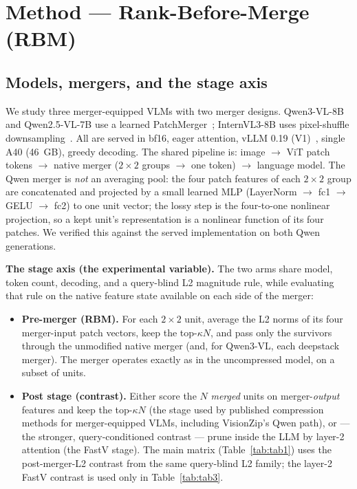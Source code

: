 \documentclass[sigconf,nonacm]{acmart}
\begin{document}
\section{Method --- Rank-Before-Merge (RBM)}\label{sec:method}

\subsection{Models, mergers, and the stage axis}\label{sec:models}

We study three merger-equipped VLMs with two merger designs. Qwen3-VL-8B
and Qwen2.5-VL-7B use a learned PatchMerger~\cite{bai2025qwen3vl,bai2025qwen25vl};
InternVL3-8B uses pixel-shuffle downsampling~\cite{zhu2025internvl3}.
All are served in bf16, eager
attention, vLLM 0.19 (V1)~\cite{kwon2023vllm}, single A40 (46~GB), greedy
decoding. The shared
pipeline is: image $\to$ ViT patch tokens $\to$ native merger ($2\!\times\!2$
groups $\to$ one token) $\to$ language model. The Qwen merger is \emph{not} an
averaging pool: the four patch features of each $2\!\times\!2$ group are
concatenated and projected by a small learned MLP (LayerNorm $\to$ fc1 $\to$
GELU $\to$ fc2) to one unit vector; the lossy step is the four-to-one nonlinear
projection, so a kept unit's representation is a nonlinear function of its four
patches. We verified this against the served implementation on both Qwen
generations.

\textbf{The stage axis (the experimental variable).} The two arms share model,
token count, decoding, and a query-blind L2 magnitude rule, while evaluating
that rule on the native feature state available on each side of the merger:
\begin{itemize}
  \item \textbf{Pre-merger (RBM).} For each $2\!\times\!2$ unit, average the
    L2 norms of its four merger-input patch vectors, keep the top-$\kappa N$,
    and pass only the
    survivors through the unmodified native merger (and, for Qwen3-VL, each
    deepstack merger). The merger operates exactly as in the uncompressed model,
    on a subset of units.
  \item \textbf{Post stage (contrast).} Either score the $N$ \emph{merged} units
    on merger-\emph{output} features and keep the top-$\kappa N$ (the stage used
    by published compression methods for merger-equipped VLMs, including
    VisionZip's Qwen path), or --- the stronger, query-conditioned contrast ---
    prune inside the LLM by layer-2 attention (the FastV stage). The main
    matrix (Table~\ref{tab:tab1}) uses the post-merger-L2
    contrast from the same query-blind L2 family; the
    layer-2 FastV contrast is used only in Table~\ref{tab:tab3}.
\end{itemize}
\end{document}
